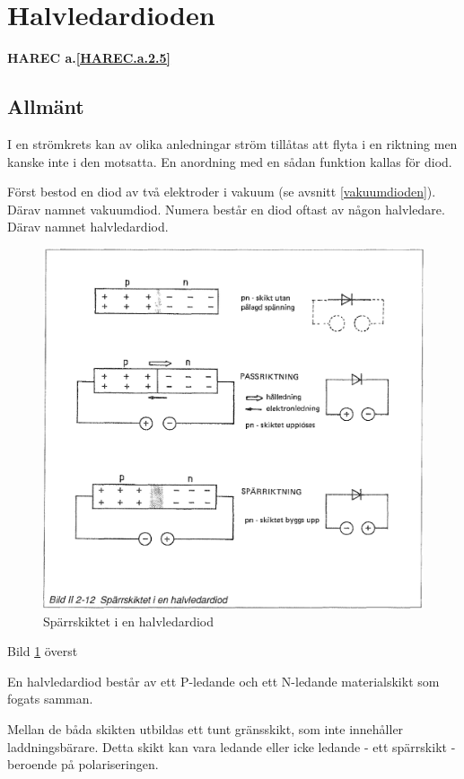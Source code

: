 \section{Halvledardioden}
\textbf{HAREC a.\ref{HAREC.a.2.5}\label{myHAREC.a.2.5}}

\subsection{Allmänt}
I en strömkrets kan av olika anledningar ström tillåtas att flyta i en riktning
men kanske inte i den motsatta. En anordning med en sådan funktion kallas för
diod.

Först bestod en diod av två elektroder i vakuum (se avsnitt
\ref{vakuumdioden}). Därav namnet vakuumdiod.
Numera består en diod oftast av någon halvledare. Därav namnet halvledardiod.

\begin{figure}
\includegraphics[width=\textwidth]{images/bild_2_2-12}
\caption{Spärrskiktet i en halvledardiod}
\label{fig:BildII2-12}
\end{figure}

Bild \ref{fig:BildII2-12} överst

En halvledardiod består av ett P-ledande och ett N-ledande materialskikt som
fogats samman.

Mellan de båda skikten utbildas ett tunt gränsskikt, som inte innehåller
laddningsbärare. Detta skikt kan vara ledande eller icke ledande - ett
spärrskikt - beroende på polariseringen.

